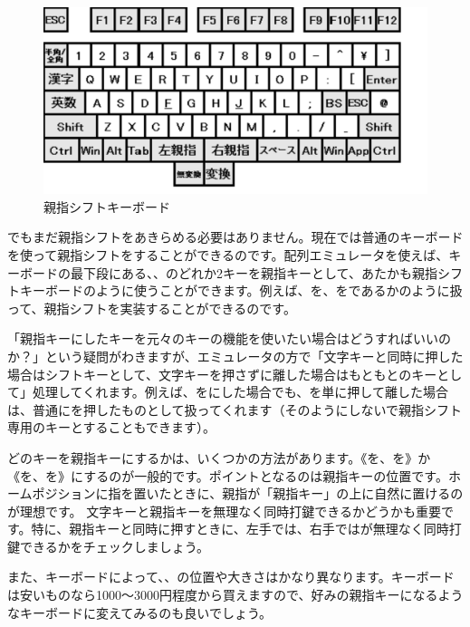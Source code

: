\begin{figure}
 \begin{center}
   \includegraphics[width=14cm,clip]{res_kouy/oyayubi-shift_keyboard.eps}
 \end{center}
 \caption{親指シフトキーボード}
 \label{oyayubi-shift_keyboard}
\end{figure}

でもまだ親指シフトをあきらめる必要はありません。現在では普通のキーボードを使って親指シフトをすることができるのです。配列エミュレータを使えば、キーボードの最下段にある、、のどれか2キーを親指キーとして、あたかも親指シフトキーボードのように使うことができます。例えば、を、をであるかのように扱って、親指シフトを実装することができるのです。

「親指キーにしたキーを元々のキーの機能を使いたい場合はどうすればいいのか？」という疑問がわきますが、エミュレータの方で「文字キーと同時に押した場合はシフトキーとして、文字キーを押さずに離した場合はもともとのキーとして」処理してくれます。例えば、をにした場合でも、を単に押して離した場合は、普通にを押したものとして扱ってくれます（そのようにしないで親指シフト専用のキーとすることもできます）。

どのキーを親指キーにするかは、いくつかの方法があります。《を、を》か《を、を》にするのが一般的です。ポイントとなるのは親指キーの位置です。ホームポジションに指を置いたときに、親指が「親指キー」の上に自然に置けるのが理想です。
文字キーと親指キーを無理なく同時打鍵できるかどうかも重要です。特に、親指キーと同時に押すときに、左手では、右手では\key{,}\key{/}が無理なく同時打鍵できるかをチェックしましょう。

また、キーボードによって、、の位置や大きさはかなり異なります。キーボードは安いものなら1000～3000円程度から買えますので、好みの親指キーになるようなキーボードに変えてみるのも良いでしょう。


